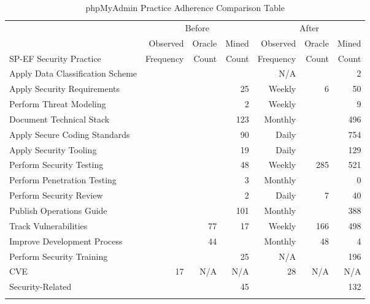 \begin{table*}
	\begin{center}	
		\caption{phpMyAdmin Practice Adherence Comparison Table}
		\begin{tiny}
			
			\begin{tabular}{|l|rrr||rrr|}
				\topline
				\headcol & \multicolumn{3}{c}{Before} & \multicolumn{3}{c}{After}\\
				\headcol  & Observed & Oracle & Mined  & Observed & Oracle & Mined \\ 
				\headcol  SP-EF Security Practice  & Frequency & Count & Count & Frequency & Count & Count\\
				\midline	
				Apply Data Classification Scheme & &  &  & N/A & & 2\\
				Apply Security Requirements  & &  & 25  & Weekly & 6 & 50\\
				Perform Threat Modeling &  &  & 2  & Weekly & & 9\\
				Document Technical Stack  &  &  & 123  & Monthly & & 496\\
				Apply Secure Coding Standards  &  &  & 90  & Daily & & 754\\
				Apply Security Tooling  &  &  & 19 & Daily & & 129\\
				Perform Security Testing &  &  & 48  & Weekly & 285 & 521\\
				Perform Penetration Testing  &  &  & 3  & Monthly & & 0\\
				Perform Security Review  &  &  & 2  & Daily & 7 & 40\\
				Publish Operations Guide &  &  & 101 & Monthly & & 388\\
				Track Vulnerabilities & & 77 & 17  & Weekly & 166 & 498\\
				Improve Development Process & & 44 &  & Monthly & 48 & 4\\
				Perform Security Training &  &  & 25 & N/A & & 196\\
				\midline
				CVE & 17 & N/A & N/A & 28 & N/A & N/A\\
				Security-Related &  &  & 45 & & & 132 \\
				
				\bottomline
			\end{tabular}
			
			\label{tab:openssl_paComparisonTable}
		\end{tiny}
	\end{center}
\end{table*}


